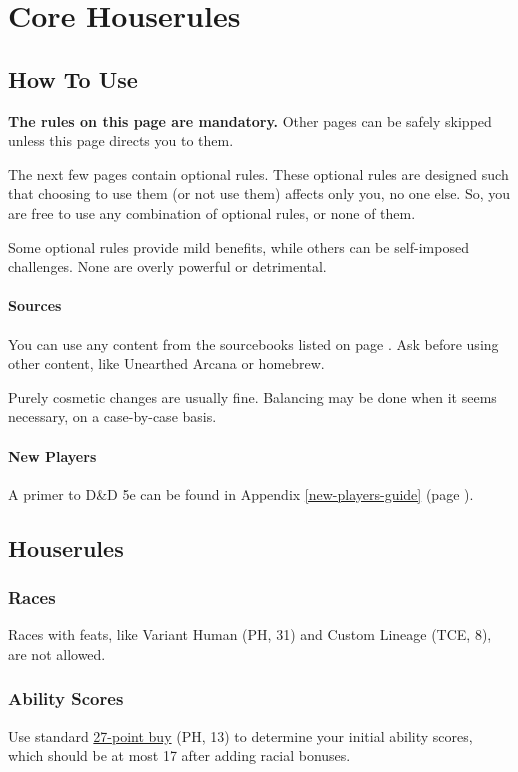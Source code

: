 \documentclass[letterpaper,twocolumn,openany,nodeprecatedcode,bg=print]{dndbook}
\newcommand{\pg}[1]{page \pageref{#1}}
\begin{document}




\chapter{Core Houserules}

\noindent [Version 8.0.0]

\section{How To Use}
\textbf{The rules on this page are mandatory.}
Other pages can be safely skipped unless this page directs you to them.

The next few pages contain optional rules. These optional rules are designed such that choosing to use them (or not use them) affects only you, no one else. 
So, you are free to use any combination of optional rules, or none of them.

Some optional rules provide mild benefits, while others can be self-imposed challenges. 
None are overly powerful or detrimental. 

\subsubsection{Sources}
You can use any content from the sourcebooks listed on \pg{sources}. 
Ask before using other content, like Unearthed Arcana or homebrew. 

Purely cosmetic changes are usually fine. Balancing may be done when it seems necessary, on a case-by-case basis. 

\subsubsection{New Players}
A primer to D\&D 5e can be found in Appendix \ref{new-players-guide} (\pg{new-players-guide}).

\newpage
\section{Houserules}

\subsection{Races}
Races with feats, like Variant Human (PH, 31) and Custom Lineage (TCE, 8), are not allowed.

\subsection{Ability Scores}
Use standard \href{https://chicken-dinner.com/5e/5e-point-buy.html}{27-point buy} (PH, 13) to determine your initial ability scores, which should be at most 17 after adding racial bonuses.
\end{document}
